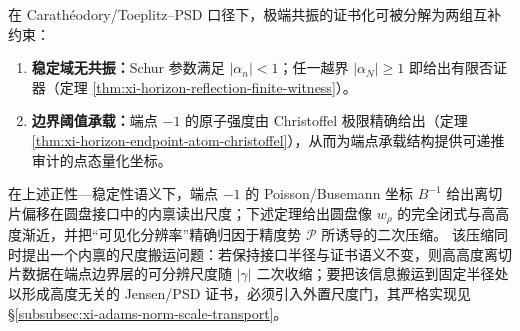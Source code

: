 \begin{corollary}\label{cor:xi-horizon-extreme-resonance-two-stage}
在 Carath\'eodory/Toeplitz--PSD 口径下，极端共振的证书化可被分解为两组互补约束：
\begin{enumerate}
  \item \textbf{稳定域无共振：}Schur 参数满足 \(|\alpha_n|<1\)；任一越界 \(|\alpha_N|\ge 1\) 即给出有限否证器（定理 \ref{thm:xi-horizon-reflection-finite-witness}）。
  \item \textbf{边界阈值承载：}端点 \(-1\) 的原子强度由 Christoffel 极限精确给出（定理 \ref{thm:xi-horizon-endpoint-atom-christoffel}），从而为端点承载结构提供可递推审计的点态量化坐标。
\end{enumerate}
\end{corollary}

在上述正性—稳定性语义下，端点 \(-1\) 的 Poisson/Busemann 坐标 \(B^{-1}\) 给出离切片偏移在圆盘接口中的内禀读出尺度；下述定理给出圆盘像 \(w_\rho\) 的完全闭式与高高度渐近，并把“可见化分辨率”精确归因于精度势 \(\mathcal{P}\) 所诱导的二次压缩。
该压缩同时提出一个内禀的尺度搬运问题：若保持接口半径与证书语义不变，则高高度离切片数据在端点边界层的可分辨尺度随 \(|\gamma|\) 二次收缩；要把该信息搬运到固定半径处以形成高度无关的 Jensen/PSD 证书，必须引入外置尺度门，其严格实现见 \S\ref{subsubsec:xi-adams-norm-scale-transport}。

